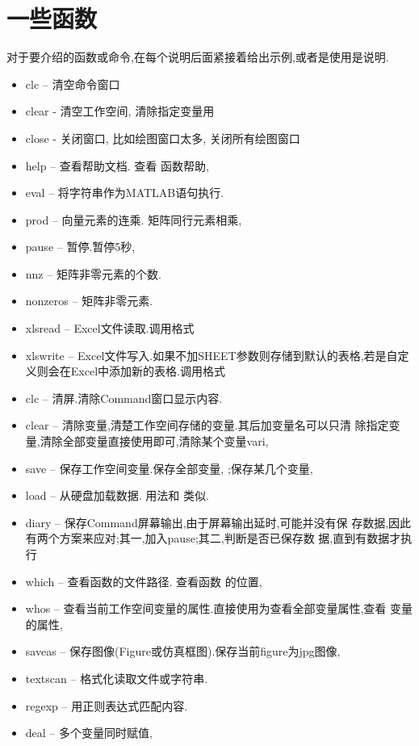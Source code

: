 \section{一些函数}
对于要介绍的函数或命令,在每个说明后面紧接着给出示例,或者是使用是说明.

\begin{itemize}
\item{clc} -- 清空命令窗口
\item{clear} - 清空工作空间, 清除指定变量用 
\item{close} - 关闭窗口, 比如绘图窗口太多, 关闭所有绘图窗口 
\item{help} -- 查看帮助文档. 查看  函数帮助, 
\item{eval} -- 将字符串作为MATLAB语句执行. 
\item{prod} -- 向量元素的连乘. 矩阵同行元素相乘, 
\item{pause} -- 暂停.暂停5秒, 
\item{nnz} -- 矩阵非零元素的个数. 
\item{nonzeros} -- 矩阵非零元素. 
\item{xlsread} -- Excel文件读取.调用格式 
\item{xlswrite} -- Excel文件写入.如果不加SHEET参数则存储到默认的表格,若是自定义则会在Excel中添加新的表格.调用格式 
\item{clc} -- 清屏.清除Command窗口显示内容. 
\item{clear} -- 清除变量,清楚工作空间存储的变量.其后加变量名可以只清
除指定变量,清除全部变量直接使用即可,清除某个变量vari, 
\item{save} -- 保存工作空间变量.保存全部变量, ;保存某几个变量,\\ 
\item{load} -- 从硬盘加载数据. 用法和  类似.
\item{diary} -- 保存Command屏幕输出,由于屏幕输出延时,可能并没有保
存数据,因此有两个方案来应对;其一,加入pause;其二,判断是否已保存数
据,直到有数据才执行 
\item{which} -- 查看函数的文件路径. 查看函数  的位置, 
\item{whos} -- 查看当前工作空间变量的属性.直接使用为查看全部变量属性,查看  变量的属性, 
\item{saveas} -- 保存图像(Figure或仿真框图).保存当前figure为jpg图像, \\ 
\item{textscan} -- 格式化读取文件或字符串.
\item{regexp} -- 用正则表达式匹配内容.
\item{deal} -- 多个变量同时赋值, \\ 
\end{itemize}